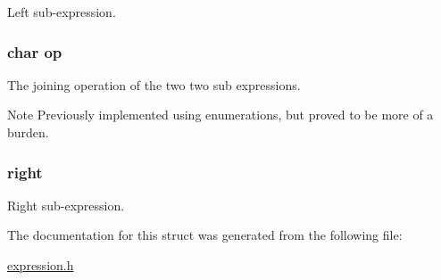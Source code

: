 Left sub-\/expression. 

\hypertarget{structexpression__data__tree_a3d5c605540ca9e9431799d5a79cb94b0}{
\subsubsection[{op}]{\setlength{\rightskip}{0pt plus 5cm}char op}}\label{structexpression__data__tree_a3d5c605540ca9e9431799d5a79cb94b0}


The joining operation of the two two sub expressions. 

\begin{DoxyNote}{Note}
Previously implemented using enumerations, but proved to be more of a burden. 
\end{DoxyNote}
\hypertarget{structexpression__data__tree_ad77c9db9f894879970e67e6cb081db60}{
\subsubsection[{right}]{ right}}\label{structexpression__data__tree_ad77c9db9f894879970e67e6cb081db60}


Right sub-\/expression. 



The documentation for this struct was generated from the following file\+:\begin{DoxyCompactItemize}
\item 
\hyperlink{expression_8h}{expression.\+h}\end{DoxyCompactItemize}

